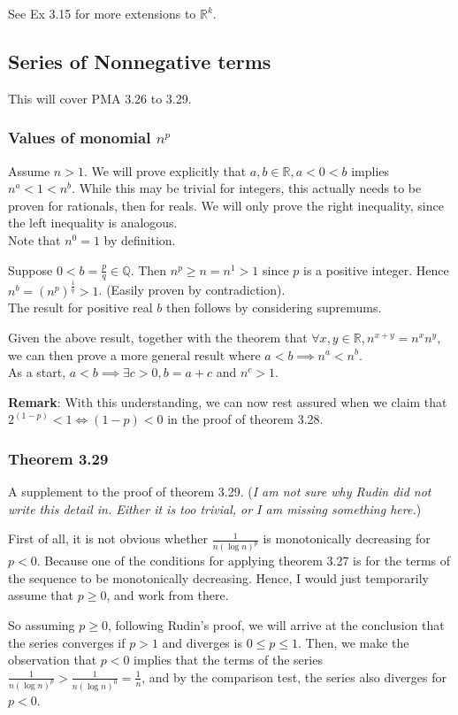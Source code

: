 \documentclass{article}
\begin{document}
See Ex 3.15 for more extensions to $\mathbb{R}^k$.

\subsection{Series of Nonnegative terms}
This will cover PMA 3.26 to 3.29.

\subsubsection{Values of monomial $n^p$}
Assume $n > 1$.
We will prove explicitly that $a,b\in \mathbb{R}, a < 0 < b$ implies $n^a < 1 < n^b$. While this may be trivial for integers, this actually needs to be proven for rationals, then for reals. We will only prove the right inequality, since the left inequality is analogous.\\
Note that $n^0=1$ by definition.

Suppose $0 < b=\frac{p}{q}\in \mathbb{Q}$. Then $n^p \geq n = n^1 > 1$ since $p$ is a positive integer. Hence $n^b=(n^p)^\frac{1}{q}>1$. (Easily proven by contradiction).\\
The result for positive real $b$ then follows by considering supremums.

Given the above result, together with the theorem that $\forall x,y\in \mathbb{R}, n^{x+y}=n^xn^y$, we can then prove a more general result where $a < b\implies n^a < n^b$.\\
As a start, $a < b\implies \exists c > 0, b = a + c$ and $n^c > 1$.


\textbf{Remark}: With this understanding, we can now rest assured when we claim that $2^{(1-p)}<1 \iff (1-p) < 0$ in the proof of theorem 3.28.

\subsubsection{Theorem 3.29}
A supplement to the proof of theorem 3.29. (\textit{I am not sure why Rudin did not write this detail in. Either it is too trivial, or I am missing something here.})

First of all, it is not obvious whether $\frac{1}{n(\log n)^p}$ is monotonically decreasing for $p<0$. Because one of the conditions for applying theorem 3.27 is for the terms of the sequence to be monotonically decreasing. Hence, I would just temporarily assume that $p\geq 0$, and work from there.

So assuming $p\geq 0$, following Rudin's proof, we will arrive at the conclusion that the series converges if $p > 1$ and diverges is $0\leq p \leq 1$. Then, we make the observation that $p < 0$ implies that the terms of the series $\frac{1}{n(\log n)^p} > \frac{1}{n(\log n)^0}=\frac{1}{n}$, and by the comparison test, the series also diverges for $p < 0$.
\end{document}
